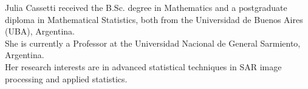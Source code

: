 \documentclass[journal]{IEEEtran}
\numberwithin{equation}{section}
\begin{document}



\begin{IEEEbiography}{Julia Cassetti} 
	received the B.Sc. degree in Mathematics and a postgraduate diploma in Mathematical Statistics, both from the Universidad de Buenos Aires (UBA), Argentina. \\
	She is currently a Professor at the Universidad Nacional de General Sarmiento, Argentina.\\ 
	Her research interests are in advanced statistical techniques in SAR image processing and applied statistics.
\end{IEEEbiography}
\end{document}
